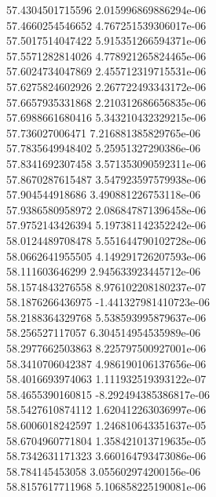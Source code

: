{57.4304501715596 2.015996869886294e-06 \\
57.4660254546652 4.767251539306017e-06 \\
57.5017514047422 5.915351266594371e-06 \\
57.5571282814026 4.778921265824465e-06 \\
57.6024734047869 2.455712319715531e-06 \\
57.6275824602926 2.267722493343172e-06 \\
57.6657935331868 2.210312686656835e-06 \\
57.6988661680416 5.343210432329215e-06 \\
57.736027006471 7.216881385829765e-06 \\
57.7835649948402 5.25951327290386e-06 \\
57.8341692307458 3.571353090592311e-06 \\
57.8670287615487 3.547923597579938e-06 \\
57.904544918686 3.490881226753118e-06 \\
57.9386580958972 2.086847871396458e-06 \\
57.9752143426394 5.197381142352242e-06 \\
58.0124489708478 5.551644790102728e-06 \\
58.0662641955505 4.149291726207593e-06 \\
58.111603646299 2.945633923445712e-06 \\
58.1574843276558 8.976102208180237e-07 \\
58.1876266436975 -1.441327981410723e-06 \\
58.2188364329768 5.538593995879637e-06 \\
58.256527117057 6.304514954535989e-06 \\
58.2977662503863 8.225797500927001e-06 \\
58.3410706042387 4.986190106137656e-06 \\
58.4016693974063 1.111932519393122e-07 \\
58.4655390160815 -8.292494385386817e-06 \\
58.5427610874112 1.620412263036997e-06 \\
58.6006018242597 1.246810643351637e-05 \\
58.6704960771804 1.358421013719635e-05 \\
58.7342631171323 3.660164793473086e-06 \\
58.784145453058 3.055602974200156e-06 \\
58.8157617711968 5.106858225190081e-06 \\
}
